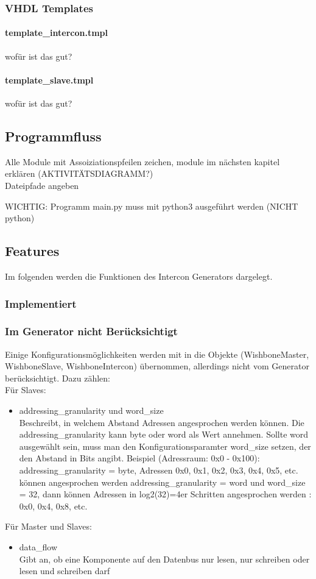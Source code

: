 \documentclass{article}
\begin{document}
\subsubsection{VHDL Templates}
\paragraph{template\_intercon.tmpl}
wofür ist das gut?
\paragraph{template\_slave.tmpl}
wofür ist das gut?
\subsection{Programmfluss}
Alle Module mit Assoiziationspfeilen zeichen, module im nächsten kapitel erklären (AKTIVITÄTSDIAGRAMM?)\\
Dateipfade angeben

WICHTIG: Programm main.py muss mit python3 ausgeführt werden (NICHT python)
\subsection{Features}
Im folgenden werden die Funktionen des Intercon Generators dargelegt.
\subsubsection{Implementiert}
\subsubsection{Im Generator nicht Berücksichtigt}
Einige Konfigurationsmöglichkeiten werden mit in die Objekte (WishboneMaster, WishboneSlave, WishboneIntercon) übernommen, allerdings nicht vom Generator berücksichtigt. Dazu zählen:\\
Für Slaves:
\begin{itemize}
\item addressing\_granularity und word\_size\\
Beschreibt, in welchem Abstand Adressen angesprochen werden können.
Die addressing\_granularity kann byte oder word als Wert annehmen.
Sollte word ausgewählt sein, muss man den Konfigurationsparamter word\_size 
setzen, der den Abstand in Bits angibt. Beispiel (Adressraum: 0x0 - 0x100):\\
addressing\_granularity = byte, Adressen 0x0, 0x1, 0x2, 0x3, 0x4, 0x5, etc. können angesprochen werden
addressing\_granularity = word und word\_size = 32, dann können Adressen in log2(32)=4er Schritten angesprochen werden : 0x0, 0x4, 0x8, etc.
\end{itemize}
Für Master und Slaves:
\begin{itemize}
\item data\_flow\\
Gibt an, ob eine Komponente auf den Datenbus nur lesen, nur schreiben oder lesen und schreiben darf
\end{itemize}
\end{document}

